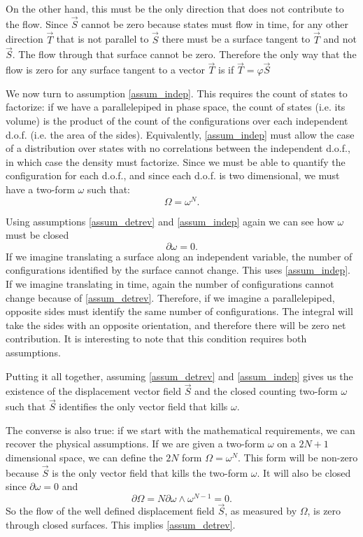 \documentclass[10pt,twocolumn, nofootinbib]{revtex4-2}
\begin{document}
On the other hand, this must be the only direction that does not contribute to the flow. Since $\vec{S}$ cannot be zero because states must flow in time, for any other direction $\vec{T}$ that is not parallel to $\vec{S}$ there must be a surface tangent to $\vec{T}$ and not $\vec{S}$. The flow through that surface cannot be zero. Therefore the only way that the flow is zero for any surface tangent to a vector $\vec{T}$ is if $\vec{T}= \varphi \vec{S}$

We now turn to assumption \ref{assum_indep}. This requires the count of states to factorize: if we have a parallelepiped in phase space, the count of states (i.e. its volume) is the product of the count of the configurations over each independent d.o.f. (i.e. the area of the sides). Equivalently, \ref{assum_indep} must allow the case of a distribution over states with no correlations between the independent d.o.f., in which case the density must factorize. Since we must be able to quantify the configuration for each d.o.f., and since each d.o.f. is two dimensional, we must have a two-form $\omega$ such that:
\begin{equation}
	\Omega = \omega^N.
\end{equation}

Using assumptions \ref{assum_detrev} and \ref{assum_indep} again we can see how $\omega$ must be closed
\begin{equation}
	\partial \omega = 0.
\end{equation}
If we imagine translating a surface along an independent variable, the number of configurations identified by the surface cannot change. This uses \ref{assum_indep}. If we imagine translating in time, again the number of configurations cannot change because of \ref{assum_detrev}. Therefore, if we imagine a parallelepiped, opposite sides must identify the same number of configurations. The integral will take the sides with an opposite orientation, and therefore there will be zero net contribution. It is interesting to note that this condition requires both assumptions.

Putting it all together, assuming \ref{assum_detrev} and \ref{assum_indep} gives us the existence of the displacement vector field $\vec{S}$ and the closed counting two-form $\omega$ such that $\vec{S}$ identifies the only vector field that kills $\omega$.

The converse is also true: if we start with the mathematical requirements, we can recover the physical assumptions. If we are given a two-form $\omega$ on a $2N+1$ dimensional space, we can define the $2N$ form $\Omega = \omega^N$. This form will be non-zero because $\vec{S}$ is the only vector field that kills the two-form $\omega$. It will also be closed since $\partial \omega = 0$ and
\begin{equation}
	\partial \Omega = N\partial \omega \wedge \omega^{N-1} = 0.
\end{equation}
So the flow of the well defined displacement field $\vec{S}$, as measured by $\Omega$, is zero through closed surfaces. This implies \ref{assum_detrev}.
\end{document}
